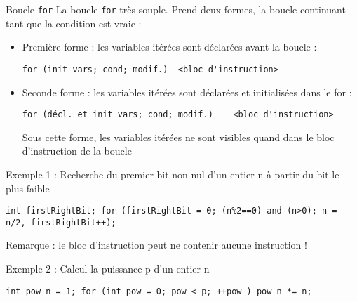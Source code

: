 \documentclass[compress,10pt,aspectratio=169]{beamer}
\begin{document}
\begin{frame}[fragile]{Boucle \texttt{for}}
    \scriptsize
    La boucle \texttt{for} très souple. Prend deux formes, la boucle continuant tant que la condition est vraie :
    \begin{itemize}
    \item Première forme : les variables itérées sont déclarées avant la boucle :
\begin{verbatim}
for (init vars; cond; modif.)  <bloc d'instruction> 
\end{verbatim}
    \item Seconde forme : les variables itérées sont déclarées et initialisées dans le for :
\begin{verbatim}
for (décl. et init vars; cond; modif.)    <bloc d'instruction>
\end{verbatim}
    Sous cette forme, les variables itérées ne sont visibles quand dans le bloc d'instruction de la boucle
\end{itemize}
\begin{exampleblock}{\scriptsize Exemple 1 : Recherche du premier bit non nul d'un entier n à partir du bit le plus faible}
\begin{verbatim}
int firstRightBit; for (firstRightBit = 0; (n%2==0) and (n>0); n = n/2, firstRightBit++);
\end{verbatim}
\end{exampleblock}
\alert{Remarque} : le bloc d'instruction peut ne contenir aucune instruction !
\begin{exampleblock}{\scriptsize Exemple 2 : Calcul la puissance p d'un entier n}
\begin{verbatim}
int pow_n = 1; for (int pow = 0; pow < p; ++pow ) pow_n *= n;
\end{verbatim}
\end{exampleblock}
\end{frame}
\end{document}
